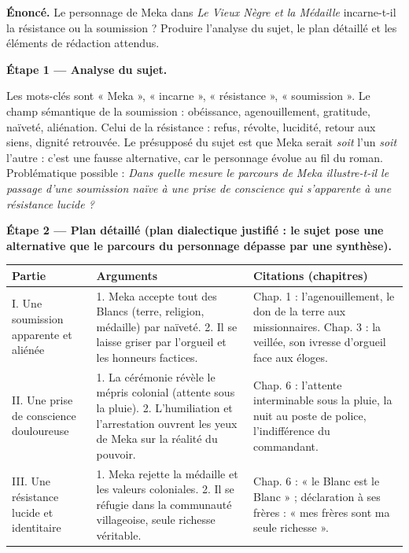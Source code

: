 \documentclass[11pt]{article}
\newcounter{popsec}
\newcounter{popsub}
\newcommand{\courssub}[1]{%
  \stepcounter{popsub}%
  \par\vspace{9pt}\noindent{\popxbold\fontsize{11.5}{13}\selectfont\color{popink}{\color{poporange}\thepopsec.\thepopsub}\hspace{6pt}#1}\par\nopagebreak\vspace{4pt}
}
\begin{document}
\courssub{Démarche et corrigé commenté}

\begin{exoresolu}
\textbf{Énoncé.} Le personnage de Meka dans \emph{Le Vieux Nègre et la Médaille} incarne-t-il la résistance ou la soumission ? Produire l'analyse du sujet, le plan détaillé et les éléments de rédaction attendus.

\tcblower

\textbf{Étape 1 — Analyse du sujet.}

Les mots-clés sont « Meka », « incarne », « résistance », « soumission ». Le champ sémantique de la soumission : obéissance, agenouillement, gratitude, naïveté, aliénation. Celui de la résistance : refus, révolte, lucidité, retour aux siens, dignité retrouvée. Le présupposé du sujet est que Meka serait \emph{soit} l'un \emph{soit} l'autre : c'est une fausse alternative, car le personnage évolue au fil du roman. Problématique possible : \emph{Dans quelle mesure le parcours de Meka illustre-t-il le passage d'une soumission naïve à une prise de conscience qui s'apparente à une résistance lucide ?}

\textbf{Étape 2 — Plan détaillé (plan dialectique justifié : le sujet pose une alternative que le parcours du personnage dépasse par une synthèse).}

\begin{center}
\begin{tabularx}{\linewidth}{|l|X|X|}
\hline
\rowcolor{popblueL} \textbf{Partie} & \textbf{Arguments} & \textbf{Citations (chapitres)} \\
\hline
I. Une soumission apparente et aliénée & 1. Meka accepte tout des Blancs (terre, religion, médaille) par naïveté. 2. Il se laisse griser par l'orgueil et les honneurs factices. & Chap. 1 : l'agenouillement, le don de la terre aux missionnaires. Chap. 3 : la veillée, son ivresse d'orgueil face aux éloges. \\
\hline
II. Une prise de conscience douloureuse & 1. La cérémonie révèle le mépris colonial (attente sous la pluie). 2. L'humiliation et l'arrestation ouvrent les yeux de Meka sur la réalité du pouvoir. & Chap. 6 : l'attente interminable sous la pluie, la nuit au poste de police, l'indifférence du commandant. \\
\hline
III. Une résistance lucide et identitaire & 1. Meka rejette la médaille et les valeurs coloniales. 2. Il se réfugie dans la communauté villageoise, seule richesse véritable. & Chap. 6 : « le Blanc est le Blanc » ; déclaration à ses frères : « mes frères sont ma seule richesse ». \\
\hline
\end{tabularx}
\end{center}


\end{exoresolu}
\end{document}
